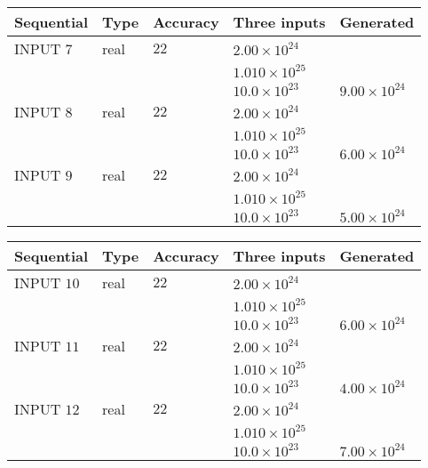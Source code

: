 \documentclass[12pt]{article}
\begin{document}
   
  
  
\noindent\begin{tabular}{|l|l|l|l|l|}
\hline
 Sequential & Type & Accuracy & Three inputs & Generated \\ 
\hline
 
 
  INPUT $           7$ & real & $          22 $ & $
 2.00 \times 10^{24}
  $ & \\
  & & &  $
 1.010 \times 10^{25}
  $ & \\
  & & &  $
 10.0 \times 10^{23}
 $ & $ 9.00 \times 10^{24} $ 
 \\  \hline  
 
 
  INPUT $           8$ & real & $          22 $ & $
 2.00 \times 10^{24}
  $ & \\
  & & &  $
 1.010 \times 10^{25}
  $ & \\
  & & &  $
 10.0 \times 10^{23}
 $ & $ 6.00 \times 10^{24} $ 
 \\  \hline  
 
 
  INPUT $           9$ & real & $          22 $ & $
 2.00 \times 10^{24}
  $ & \\
  & & &  $
 1.010 \times 10^{25}
  $ & \\
  & & &  $
 10.0 \times 10^{23}
 $ & $ 5.00 \times 10^{24} $ 
 \\  \hline  
 \end{tabular}
   
   
  
  
\noindent\begin{tabular}{|l|l|l|l|l|}
\hline
 Sequential & Type & Accuracy & Three inputs & Generated \\ 
\hline
 
 
  INPUT $          10$ & real & $          22 $ & $
 2.00 \times 10^{24}
  $ & \\
  & & &  $
 1.010 \times 10^{25}
  $ & \\
  & & &  $
 10.0 \times 10^{23}
 $ & $ 6.00 \times 10^{24} $ 
 \\  \hline  
 
 
  INPUT $          11$ & real & $          22 $ & $
 2.00 \times 10^{24}
  $ & \\
  & & &  $
 1.010 \times 10^{25}
  $ & \\
  & & &  $
 10.0 \times 10^{23}
 $ & $ 4.00 \times 10^{24} $ 
 \\  \hline  
 
 
  INPUT $          12$ & real & $          22 $ & $
 2.00 \times 10^{24}
  $ & \\
  & & &  $
 1.010 \times 10^{25}
  $ & \\
  & & &  $
 10.0 \times 10^{23}
 $ & $ 7.00 \times 10^{24} $ 
 \\  \hline  
 \end{tabular}
   
\end{document}
